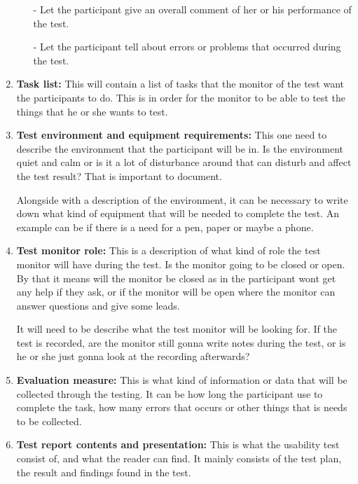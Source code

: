 \begin{enumerate}
\begin{enumerate}
  - Let the participant give an overall comment of her or his performance of the test.
  
  - Let the participant tell about errors or problems that occurred during the test.
  
  \end{enumerate}
  \item \textbf{Task list:} This will contain a list of tasks that the monitor of the test want the participants to do. This is in order for the monitor to be able to test the things that he or she wants to test.
  
  \item \textbf{Test environment and equipment requirements:} This one need to describe the environment that the participant will be in. Is the environment quiet and calm or is it a lot of disturbance around that can disturb and affect the test result? That is important to document.
  
  Alongside with a description of the environment, it can be necessary to write down what kind of equipment that will be needed to complete the test. An example can be if there is a need for a pen, paper or maybe a phone. 
  
  \item \textbf{Test monitor role:} This is a description of what kind of role the test monitor will have during the test. Is the monitor going to be closed or open. By that it means will the monitor be closed as in the participant wont get any help if they ask, or if the monitor will be open where the monitor can answer questions and give some leads.
  
  It will need to be describe what the test monitor will be looking for. If the test is recorded, are the monitor still gonna write notes during the test, or is he or she just gonna look at the recording afterwards?  
  
  \item \textbf{Evaluation measure:} This is what kind of information or data that will be collected through the testing. It can be how long the participant use to complete the task, how many errors that occurs or other things that is needs to be collected.

  \item \textbf{Test report contents and presentation:} This is what the usability test consist of, and what the reader can find. It mainly consists of the test plan, the result and findings found in the test.
\end{enumerate}